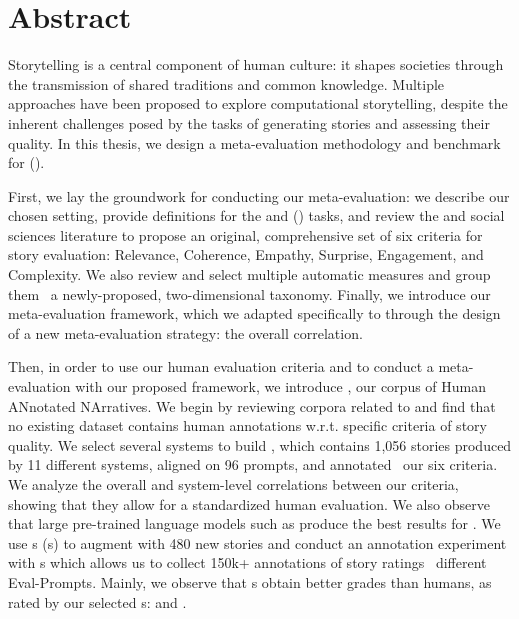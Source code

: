 \chapter*{Abstract}

Storytelling is a central component of human culture: it shapes societies through the transmission of shared traditions and common knowledge. Multiple approaches have been proposed to explore computational storytelling, despite the inherent challenges posed by the tasks of generating stories and assessing their quality. In this thesis, we design a meta-evaluation methodology and benchmark for {\asgfull} (\asg).

First, we lay the groundwork for conducting our meta-evaluation: we describe our chosen setting, provide definitions for the {\asg} and {\asefull} (\ase) tasks, and review the {\asg} and social sciences literature to propose an original, comprehensive set of six criteria for story evaluation: Relevance, Coherence, Empathy, Surprise, Engagement, and Complexity. We also review and select multiple automatic measures and group them {\wrt}\ a newly-proposed, two-dimensional taxonomy. Finally, we introduce our meta-evaluation framework, which we adapted specifically to {\asg} through the design of a new meta-evaluation strategy: the overall correlation.

Then, in order to use our human evaluation criteria and to conduct a meta-evaluation with our proposed framework, we introduce {\hanna}, our corpus of Human ANnotated NArratives. We begin by reviewing corpora related to {\asg} and find that no existing dataset contains human annotations w.r.t. specific criteria of story quality. We select several {\asg} systems to build {\hanna}, which contains 1,056 stories produced by 11 different systems, aligned on 96 prompts, and annotated {\wrt}\ our six criteria. We analyze the overall and system-level correlations between our criteria, showing that they allow for a standardized human evaluation. We also observe that large pre-trained language models such as {\gptt} produce the best results for {\asg}. We use {\llmfull}s ({\llm}s) to augment {\hanna} with 480 new stories and conduct an annotation experiment with {\llm}s which allows us to collect 150k+ annotations of story ratings {\wrt}\ different Eval-Prompts. Mainly, we observe that {\llm}s obtain better grades than humans, as rated by our selected {\llm}s: {\beluga} and {\mistral}.

